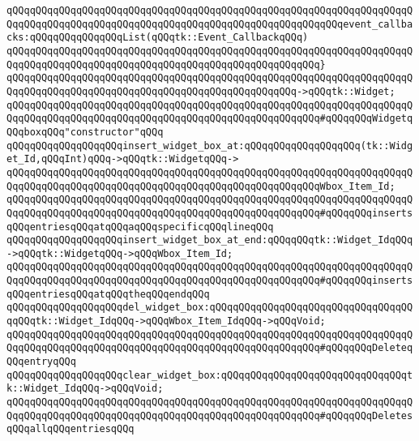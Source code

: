 \verb|qQQqqQQqqQQqqQQqqQQqqQQqqQQqqQQqqQQqqQQqqQQqqQQqqQQqqQQqqQQqqQQqqQQqqQQqqQQqqQQqqQQqqQQqqQQqqQQqqQQqqQQqqQQqqQQqqQQqqQQqqQQqqQQqevent_callbacks:qQQqqQQqqQQqqQQqList(qQQqtk::Event_CallbackqQQq)|\newline
\verb|qQQqqQQqqQQqqQQqqQQqqQQqqQQqqQQqqQQqqQQqqQQqqQQqqQQqqQQqqQQqqQQqqQQqqQQqqQQqqQQqqQQqqQQqqQQqqQQqqQQqqQQqqQQqqQQqqQQqqQQqqQQq}|\newline
\verb|qQQqqQQqqQQqqQQqqQQqqQQqqQQqqQQqqQQqqQQqqQQqqQQqqQQqqQQqqQQqqQQqqQQqqQQqqQQqqQQqqQQqqQQqqQQqqQQqqQQqqQQqqQQqqQQqqQQqqQQq->qQQqtk::Widget;|\newline
\verb|qQQqqQQqqQQqqQQqqQQqqQQqqQQqqQQqqQQqqQQqqQQqqQQqqQQqqQQqqQQqqQQqqQQqqQQqqQQqqQQqqQQqqQQqqQQqqQQqqQQqqQQqqQQqqQQqqQQqqQQqqQQq#qQQqqQQqWidgetqQQqboxqQQq"constructor"qQQq|\newline
\newline
\verb|qQQqqQQqqQQqqQQqqQQqinsert_widget_box_at:qQQqqQQqqQQqqQQqqQQq(tk::Widget_Id,qQQqInt)qQQq->qQQqtk::WidgetqQQq->|\newline
\verb|qQQqqQQqqQQqqQQqqQQqqQQqqQQqqQQqqQQqqQQqqQQqqQQqqQQqqQQqqQQqqQQqqQQqqQQqqQQqqQQqqQQqqQQqqQQqqQQqqQQqqQQqqQQqqQQqqQQqqQQqqQQqWbox_Item_Id;|\newline
\verb|qQQqqQQqqQQqqQQqqQQqqQQqqQQqqQQqqQQqqQQqqQQqqQQqqQQqqQQqqQQqqQQqqQQqqQQqqQQqqQQqqQQqqQQqqQQqqQQqqQQqqQQqqQQqqQQqqQQqqQQqqQQq#qQQqqQQqinsertsqQQqentriesqQQqatqQQqaqQQqspecificqQQqlineqQQq|\newline
\newline
\verb|qQQqqQQqqQQqqQQqqQQqinsert_widget_box_at_end:qQQqqQQqtk::Widget_IdqQQq->qQQqtk::WidgetqQQq->qQQqWbox_Item_Id;|\newline
\verb|qQQqqQQqqQQqqQQqqQQqqQQqqQQqqQQqqQQqqQQqqQQqqQQqqQQqqQQqqQQqqQQqqQQqqQQqqQQqqQQqqQQqqQQqqQQqqQQqqQQqqQQqqQQqqQQqqQQqqQQqqQQq#qQQqqQQqinsertsqQQqentriesqQQqatqQQqtheqQQqendqQQq|\newline
\newline
\verb|qQQqqQQqqQQqqQQqqQQqdel_widget_box:qQQqqQQqqQQqqQQqqQQqqQQqqQQqqQQqqQQqqQQqtk::Widget_IdqQQq->qQQqWbox_Item_IdqQQq->qQQqVoid;|\newline
\verb|qQQqqQQqqQQqqQQqqQQqqQQqqQQqqQQqqQQqqQQqqQQqqQQqqQQqqQQqqQQqqQQqqQQqqQQqqQQqqQQqqQQqqQQqqQQqqQQqqQQqqQQqqQQqqQQqqQQqqQQqqQQq#qQQqqQQqDeleteqQQqentryqQQq|\newline
\newline
\verb|qQQqqQQqqQQqqQQqqQQqclear_widget_box:qQQqqQQqqQQqqQQqqQQqqQQqqQQqqQQqtk::Widget_IdqQQq->qQQqVoid;|\newline
\verb|qQQqqQQqqQQqqQQqqQQqqQQqqQQqqQQqqQQqqQQqqQQqqQQqqQQqqQQqqQQqqQQqqQQqqQQqqQQqqQQqqQQqqQQqqQQqqQQqqQQqqQQqqQQqqQQqqQQqqQQqqQQq#qQQqqQQqDeletesqQQqallqQQqentriesqQQq|\newline
